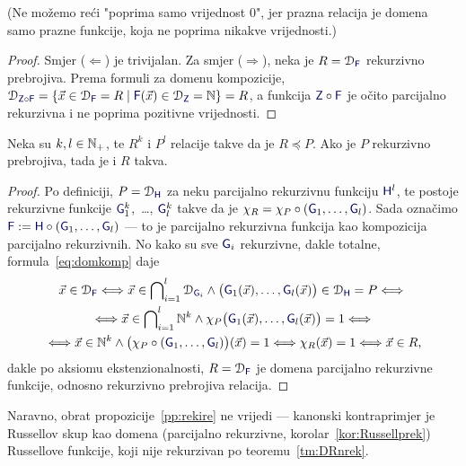 (Ne možemo reći "poprima samo vrijednost $0$", jer prazna relacija je domena samo prazne funkcije, koja ne poprima nikakve vrijednosti.)

\begin{proof}
Smjer ($\Leftarrow$) je trivijalan. Za smjer ($\Rightarrow$), neka je $R=\dom{\f F}$ rekurzivno prebrojiva. Prema formuli za domenu kompozicije, $\dom{\f Z\circ\f F}=\{\vec x\in\dom{\f F}=R\mid\f F(\vec x)\in\dom{\f Z}=\N\}=R$, a funkcija $\f Z\circ\f F$ je očito parcijalno rekurzivna i ne poprima pozitivne vrijednosti.
\end{proof}

\begin{lema}[{name=[svedivost čuva rekurzivnu prebrojivost]}]\label{lm:re<re}
Neka su $k,l\in{\mathbb N}_+$, te $R^k$ i $P^l$ relacije takve da je $R\preceq P$. Ako je $P$ rekurzivno prebrojiva, tada je i $R$ takva.
\end{lema}
\begin{proof}
Po definiciji, $P=\dom{\f H}$ za neku parcijalno rekurzivnu funkciju $\f H^l$, te postoje rekurzivne funkcije $\f G_1^k$,~\ldots, $\f G_l^k$ takve da je $\chi_R=\chi_P\circ(\f G_1,\dotsc,\f G_l)$. Sada označimo $\f F:=\f H\circ(\f G_1,\dotsc,\f G_l)$ --- to je parcijalno rekurzivna funkcija kao kompozicija parcijalno rekurzivnih. No kako su sve $\f G_i$ rekurzivne, dakle totalne, formula~\eqref{eq:domkomp} daje
\begin{multline}
    \vec x\in\dom{\f F}\Longleftrightarrow
    \vec x\in\bigcap\nolimits_{i=1}^l\dom{\f G_i}\land
    \bigl(\f G_1(\vec x),\dotsc,\f G_l(\vec x)\bigr)\in\dom{\f H}=P\Longleftrightarrow{}\\
    {}\Longleftrightarrow\vec x\in\bigcap\nolimits_{i=1}^l\N^k\land\chi_P\bigl(\f G_1(\vec x),\dotsc,\f G_l(\vec x)\bigr)=1\Longleftrightarrow{}\\
    {}\Longleftrightarrow\vec x\in\N^k\land\bigl(\chi_P\circ(\f G_1,\dotsc,\f G_l)\bigr)(\vec x)=1\Longleftrightarrow\chi_R(\vec x)=1\Longleftrightarrow\vec x\in R\text,
\end{multline}
dakle po aksiomu ekstenzionalnosti, $R=\dom{\f F}$ je domena parcijalno rekurzivne funkcije, odnosno rekurzivno prebrojiva relacija.
\end{proof}

Naravno, obrat propozicije~\ref{pp:rekire} ne vrijedi --- kanonski kontraprimjer je Russellov skup kao domena (parcijalno rekurzivne, korolar~\ref{kor:Russellprek}) Russellove funkcije, koji nije rekurzivan po teoremu~\ref{tm:DRnrek}.

